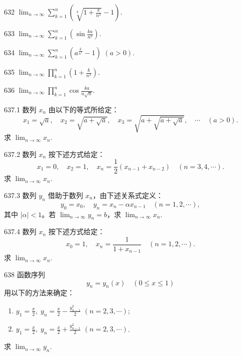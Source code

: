 
\begin{prob}[M]{632}
$\lim_{n \to \infty} \sum_{k=1}^{n} \left(\sqrt[3]{1 + \frac{k}{n^2}} - 1\right)$.
\end{prob}

\begin{prob}[M]{633}
$\lim_{n \to \infty} \sum_{k=1}^{n} \left(\sin\frac{ka}{n^2}\right)$.
\end{prob}

\begin{prob}[M]{634}
$\lim_{n \to \infty} \sum_{k=1}^{n} \left(a^{\frac{k}{n^2}} - 1\right)$ $(a > 0)$.
\end{prob}

\begin{prob}[M]{635}
$\lim_{n \to \infty} \prod_{k=1}^{n} \left(1 + \frac{k}{n^2}\right)$.
\end{prob}

\begin{prob}[M]{636}
$\lim_{n \to \infty} \prod_{k=1}^{n} \cos\frac{ka}{n\sqrt{n}}$.
\end{prob}

\begin{prob}[M]{637.1}
数列 $x_n$ 由以下的等式所给定：
\[
x_1 = \sqrt{a}, \quad x_2 = \sqrt{a + \sqrt{a}}, \quad x_3 = \sqrt{a + \sqrt{a + \sqrt{a}}}, \quad \cdots \quad (a > 0).
\]
求 $\lim_{n \to \infty} x_n$.
\end{prob}

\begin{prob}[M]{637.2}
数列 $x_n$ 按下述方式给定：
\[
x_1 = 0, \quad x_2 = 1, \quad x_n = \frac{1}{2}(x_{n-1} + x_{n-2}) \quad (n = 3, 4, \cdots).
\]
求 $\lim_{n \to \infty} x_n$.
\end{prob}

\begin{prob}[M]{637.3}
数列 $y_n$ 借助于数列 $x_n$，由下述关系式定义：
\[
y_0 = x_0, \quad y_n = x_n - \alpha x_{n-1} \quad (n = 1, 2, \cdots),
\]
其中 $|\alpha| < 1$。若 $\lim_{n \to \infty} y_n = b$，求 $\lim_{n \to \infty} x_n$.
\end{prob}

\begin{prob}[M]{637.4}
数列 $x_n$ 按下述方式给定：
\[
x_0 = 1, \quad x_n = \frac{1}{1 + x_{n-1}} \quad (n = 1, 2, \cdots).
\]
求 $\lim_{n \to \infty} x_n$.
\end{prob}

\begin{prob}[M]{638}
函数序列
\[
y_n = y_n(x) \quad (0 \leqslant x \leqslant 1)
\]
用以下的方法来确定：
\begin{enumerate}[label=(\alph*), itemsep=2pt, topsep=3pt]
\item $y_1 = \frac{x}{2}, \; y_n = \frac{x}{2} - \frac{y_{n-1}^2}{2}$ $(n = 2, 3, \cdots)$;
\item $y_1 = \frac{x}{2}, \; y_n = \frac{x}{2} + \frac{y_{n-1}^2}{2}$ $(n = 2, 3, \cdots)$.
\end{enumerate}
求 $\lim_{n \to \infty} y_n$.
\end{prob}

